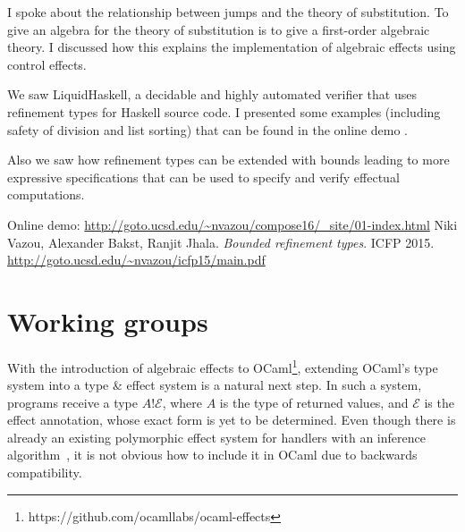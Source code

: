 \documentclass[a4paper,UKenglish]{dagrep}
\begin{document}
I spoke about the relationship between jumps and the theory of substitution. To give an algebra for the theory of substitution is to give a first-order algebraic theory. I discussed how this explains the implementation of algebraic effects using control effects.

\license
{}

We saw LiquidHaskell, a decidable and highly automated verifier that uses
refinement types for Haskell source code. I presented some examples (including
safety of division and list sorting) that can be found in the online demo
\cite{demo}.

Also we saw how refinement types can be extended with bounds \cite{icfp-paper}
leading to more expressive specifications that can be used to specify and
verify effectual computations.


\begin{thebibliography}{0}
 Online demo: \url{http://goto.ucsd.edu/~nvazou/compose16/_site/01-index.html}
 Niki Vazou, Alexander Bakst, Ranjit Jhala. \emph{Bounded
refinement types}. ICFP 2015. \url{http://goto.ucsd.edu/~nvazou/icfp15/main.pdf}
\end{thebibliography}



\section{Working groups}

\license

\newcommand{\effs}{\mathcal{E}}
\newcommand{\IO}{\mathtt{IO}}
\newcommand{\unitty}{\mathtt{unit}}
With the introduction of algebraic effects to OCaml\footnote{%
  https://github.com/ocamllabs/ocaml-effects
}, extending
OCaml's type system into a type \& effect system is a natural next step. In such a
system, programs receive a type $A ! \effs$, where $A$ is the type of returned
values, and $\effs$ is the effect annotation, whose exact form is yet to be
determined. Even though there is already an existing polymorphic effect system
for handlers with an inference algorithm~\cite{DBLP:journals/corr/Pretnar13}, it is not obvious how to
include it in OCaml due to backwards compatibility.
\end{document}
